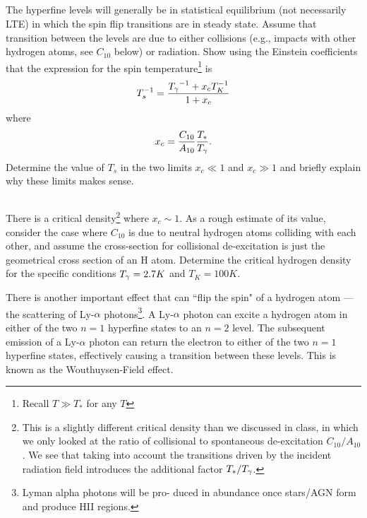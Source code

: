 \documentclass[11pt]{article}
\begin{document}
\subsection{}
The hyperfine levels will generally be in statistical equilibrium (not
necessarily LTE) in which the spin flip transitions are in steady state. Assume
that transition between the levels are due to either collisions (e.g., impacts
with other hydrogen atoms, see $C_{10}$ below) or radiation. Show using the Einstein coefficients
that the expression for the spin temperature\footnote{Recall $T\gg T_*$ for any $T$} is
\begin{equation}
T_s^{-1}=\frac{{T_\gamma}^{-1}+x_cT_K^{-1}}{1+x_c}
\end{equation}
where
\begin{equation}
x_c=\frac{C_{10}}{A_{10}}\frac{T_*}{{T_\gamma}}.
\end{equation}
Determine the value of $T_s$ in the two limits $x_c\ll1$ and $x_c\gg1$ and
briefly explain why these limits makes sense.

\subsection{}
\label{sec:subc}
There is a critical density\footnote{This is a slightly different critical
density than we discussed in class, in which we only looked at the ratio of
collisional to spontaneous de-excitation $C_{10}/A_{10}$.  We see that taking into
account the transitions driven by the incident radiation field introduces the
additional factor $T_*/{T_\gamma}$.} where $x_c\sim1$. As a rough estimate of its value,
consider the case where $C_{10}$ is due to neutral hydrogen atoms colliding with
each other, and assume the cross-section for collisional de-excitation is just
the geometrical cross section of an
H atom. Determine the critical hydrogen density for the specific conditions 
${T_\gamma}=2.7K$ and $T_K=100K$.

There is another important effect that can ``flip the spin" of a hydrogen atom
--- the scattering of Ly-$\alpha$ photons\footnote{ Lyman alpha photons will be
pro- duced in abundance once stars/AGN form and produce HII regions.  }. A
Ly-$\alpha$ photon can excite a hydrogen atom in either of the two $n = 1$
hyperfine states to an $n = 2$ level.  The subsequent emission of a Ly-$\alpha$
photon can return the electron to either of the two $n = 1$ hyperfine states,
effectively causing a transition between these levels. This is known as the
Wouthuysen-Field effect.
\end{document}
